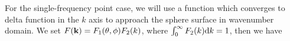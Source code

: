 \documentclass[12pt,draftclsnofoot,journal,onecolumn]{IEEEtran}
\begin{document}
%	
%	
	
	For the single-frequency point case, we will use a function which converges to delta function in the $k$ axis to approach the sphere surface in wavenumber domain. We set $F({\bf k}) =F_1(\theta,\phi)F_2(k)$, where $\int_{0}^\infty F_2(k) {\rm d}k = 1$, then we have
	
\end{document}
